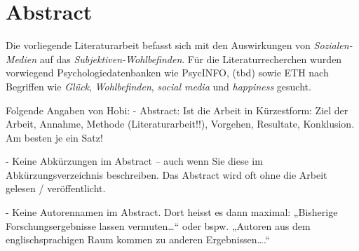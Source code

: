 %
%

\thispagestyle{empty}
\chapter*{Abstract}\label{abstract}
Die vorliegende Literaturarbeit befasst sich mit den Auswirkungen von \textit{Sozialen-Medien} auf das \textit{Subjektiven-Wohlbefinden}. Für die Literaturrecherchen wurden vorwiegend Psychologiedatenbanken wie PsycINFO, (tbd) sowie ETH nach Begriffen wie \textit{Glück}, \textit{Wohlbefinden}, \textit{social media} und \textit{happiness} gesucht. \par 
Folgende Angaben von Hobi:\newline
-          Abstract: Ist die Arbeit in Kürzestform: Ziel der Arbeit, Annahme, Methode (Literaturarbeit!!), Vorgehen, Resultate, Konklusion. Am besten je ein Satz!

-          Keine Abkürzungen im Abstract – auch wenn Sie diese im Abkürzungsverzeichnis beschreiben. Das Abstract wird oft ohne die Arbeit gelesen / veröffentlicht.

-          Keine Autorennamen im Abstract. Dort heisst es dann maximal: „Bisherige Forschungsergebnisse lassen vermuten…“ oder bspw.  „Autoren aus dem englischsprachigen Raum kommen zu anderen Ergebnissen….“

